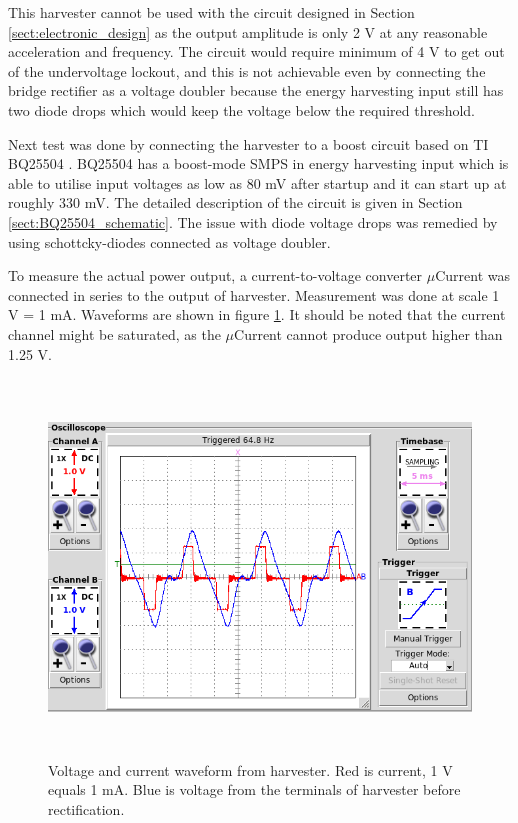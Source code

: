 This harvester cannot be used with the circuit designed in Section \ref{sect:electronic_design} as the output amplitude is only 2 V at any reasonable acceleration and frequency. The circuit would require minimum of 4 V to get out of the undervoltage lockout, and this is not achievable even by connecting the bridge rectifier as a voltage doubler because the energy harvesting input still has two diode drops which would keep the voltage below the required threshold.

Next test was done by connecting the harvester to a boost circuit based on TI BQ25504 \cite{bq25504}. BQ25504 has a boost-mode SMPS in energy harvesting input which is able to utilise input voltages as low as 80 mV after startup and it can start up at roughly 330 mV. The detailed description of the circuit is given in Section \ref{sect:BQ25504_schematic}. The issue with diode voltage drops was remedied by using schottcky-diodes connected as voltage doubler.

To measure the actual power output, a current-to-voltage converter $\mu$Current \cite{Jones2010} was connected in series to the output of harvester. Measurement was done at scale 1 V = 1 mA. Waveforms are shown in figure \ref{fig:inductive_vi_65}. It should be noted that the current channel might be saturated, as the $\mu$Current cannot produce output higher than 1.25 V.

\begin{figure}[htb]
\begin{center}
\includegraphics[height=10cm]{images/own_measurement/generator_shaker/inductive_td_harvesting_vi_65hz_ferro.png}
\end{center}
\caption{\label{fig:inductive_vi_65} Voltage and current waveform from harvester. Red is current, 1 V equals 1 mA. Blue is voltage from the terminals of harvester before rectification.}
\end{figure}

